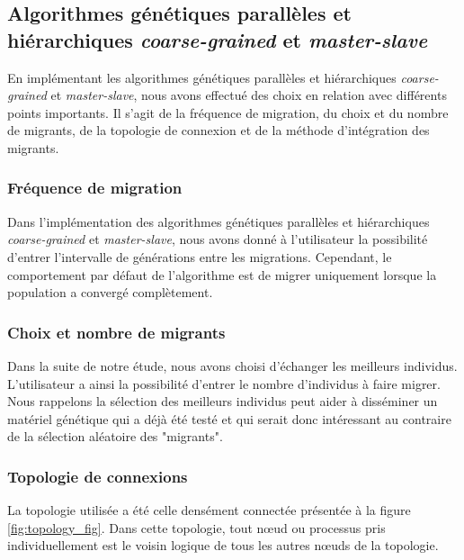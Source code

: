 	\subsection{Algorithmes génétiques parallèles et hiérarchiques \emph{coarse-grained} et \emph{master-slave}}
		
	En implémentant les algorithmes génétiques parallèles et hiérarchiques \emph{coarse-grained} et \emph{master-slave}, nous avons effectué des choix en relation avec différents points importants. Il s'agit de la fréquence de migration, du choix et du nombre de migrants, de la topologie de connexion et de la méthode d'intégration des migrants.
	 
	\subsubsection{Fréquence de migration}
	
	\hspace*{.5cm} Dans l'implémentation des algorithmes génétiques parallèles et hiérarchiques \emph{coarse-grained} et \emph{master-slave}, nous avons donné à l'utilisateur la possibilité d'entrer l'intervalle de générations entre les migrations. Cependant, le comportement par défaut de l'algorithme est de migrer uniquement lorsque la population a convergé complètement.  
	
	\subsubsection{Choix et nombre de migrants}
	 Dans la suite de notre étude, nous avons choisi d'échanger les meilleurs individus. L'utilisateur a ainsi la possibilité d'entrer le nombre d'individus à faire migrer. Nous rappelons la sélection des meilleurs individus peut aider à disséminer un matériel génétique qui a déjà été testé et qui serait donc intéressant au contraire de la sélection aléatoire des "migrants".
	 
	\subsubsection{Topologie de connexions}
	La topologie utilisée a été celle densément connectée présentée à la figure \ref{fig:topology_fig}. Dans cette topologie, tout nœud ou processus pris individuellement est le voisin logique de tous les autres nœuds de la topologie.
	
